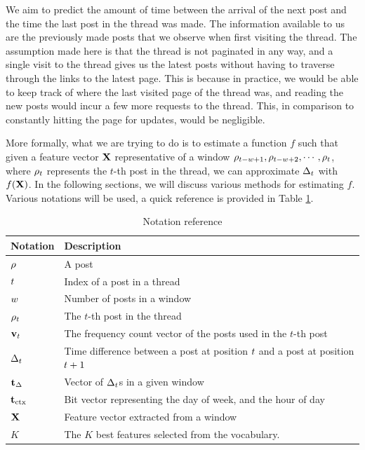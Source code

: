 We aim to predict the amount of time between the arrival of the next post and 
the time the last post in the thread was made. The information available to us 
are the previously made posts that we observe when first visiting the thread.  
The assumption made here is that the thread is not paginated in any way, and a 
single visit to the thread gives us the latest posts without having to traverse 
through the links to the latest page. This is because in practice, we would be 
able to keep track of where the last visited page of the thread was, and reading 
the new posts would incur a few more requests to the thread. This, in comparison 
to constantly hitting the page for updates, would be negligible.

More formally, what we are trying to do is to estimate a function $f$ such that 
given a feature vector $\mathbf{X}$ representative of a window $\rho_{t - w + 
1},\rho_{t - w + 2},\cdots ,\rho_t$, where $\rho_t$ represents the $t$-th 
post in the thread, we can approximate $\Delta_t$ with $f(\mathbf{X})$.  In the following 
sections, we will discuss various methods for estimating $f$.  Various notations 
will be used, a quick reference is provided in Table \ref{table:notations}.


\begin{table}
	\begin{center}
	\begin{tabular}{l l}
	\hline
Notation	&	Description\\
	\hline
$\rho$		&	A post\\
$t$		&	Index of a post in a thread\\
$w$		&	Number of posts in a window  \\
$\rho_t$	&	The $t$-th post in the thread\\
$\mathbf{v}_t$	&	The frequency count vector of the posts used in the $t$-th 
	post\\
$\Delta_t$		&	Time difference between a post at position $t$ and a post at 
	position $t+1$ \\
$\mathbf{t}_\Delta$	&	Vector of $\Delta_t$s in a given window\\
$\mathbf{t}_\text{ctx}$	&	Bit vector representing the day of week, and the hour of day\\
$\mathbf{X}$		&	Feature vector extracted from a window\\
$K$			&	The $K$ best features selected from the vocabulary.\\
	\hline
	\end{tabular}
\end{center}
\caption{Notation reference} \label{table:notations}
\end{table}


